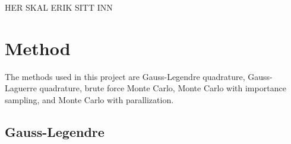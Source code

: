 \documentclass{article}
\begin{document}

HER SKAL ERIK SITT INN

\vspace{1cm}

\section{Method} \label{sec:Method}

The methods used in this project are Gauss-Legendre quadrature, Gauss-Laguerre quadrature, brute force Monte Carlo, Monte Carlo with importance sampling, and Monte Carlo with parallization.

\subsection{Gauss-Legendre}
\end{document}
